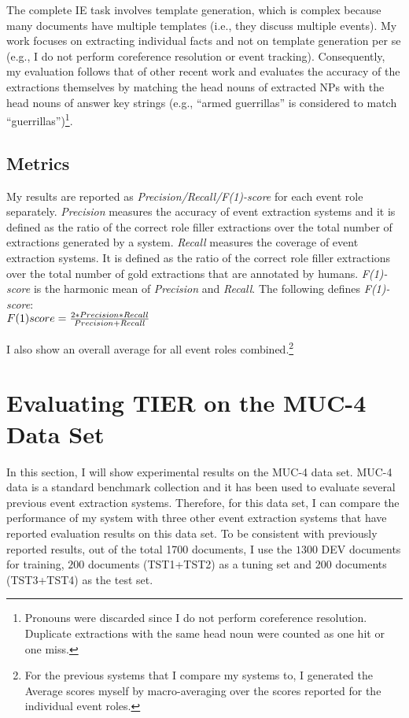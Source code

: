 The complete IE task involves template
 generation, which is complex because many documents have multiple
 templates (i.e., they discuss multiple events). My work focuses on
 extracting individual facts and not on template generation per se
 (e.g., I do not perform coreference resolution or event
 tracking). Consequently, my evaluation follows that of other recent work
 and evaluates the accuracy of the extractions themselves by matching
 the head nouns of extracted NPs with the head nouns of answer key
 strings (e.g., ``armed guerrillas'' is considered to match
 ``guerrillas'')\footnote{Pronouns were discarded since I do not
 perform coreference resolution. Duplicate extractions with the same head
 noun were counted as one hit or one miss.}.
 
\subsection{Metrics}
\label{tier:metrics}
 My results are reported as
 {\it Precision/Recall/F(1)-score} for each event role separately. 
 {\it Precision} measures the accuracy of event extraction systems and 
 it is defined as the ratio of the correct role filler extractions over 
 the total number of extractions generated by a system.
 {\it Recall} measures the coverage of event extraction systems. 
It is defined as the ratio of the correct role filler extractions over 
the total number of gold extractions that are annotated by humans. 
{\it F(1)-score} is the harmonic mean of {\it Precision} and {\it Recall}. 
The following defines {\it F(1)-score}:\\
\vspace{.1in}
$F(1)\-score = \frac{2 * Precision * Recall}{Precision + Recall}$
\vspace{.1in}


 I  also show an overall average for all event roles combined.\footnote{
For the previous systems 
that I compare my systems to, I
 generated the Average scores myself by macro-averaging over the
 scores reported for the individual event roles.}


\section{Evaluating TIER on the MUC-4 Data Set}
In this section, I will show experimental results on the MUC-4 data set. 
MUC-4 data is a standard benchmark collection and it has been used 
to evaluate several previous event extraction systems. 
Therefore, for this data set, I can compare the performance 
of my system with three other event extraction systems that have 
reported evaluation results on this data set. 
To be consistent with
previously reported results, 
out of the total 1700 documents, 
I use the $1300$ DEV
documents for training, $200$ documents (TST1+TST2) as a tuning set
and $200$ documents (TST3+TST4) as the test set.

